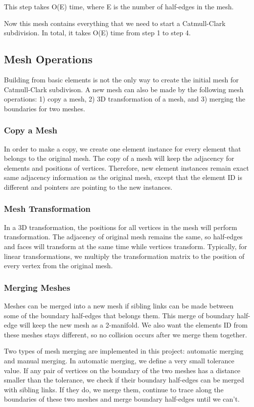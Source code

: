 \documentclass[12pt]{article}
\begin{document}
This step takes O(E) time, where E is the number of half-edges in the mesh.

Now this mesh contains everything that we need to start a Catmull-Clark subdivision. In total, it takes O(E) time from step 1 to step 4.

\subsection{Mesh Operations}
Building from basic elements is not the only way to create the initial mesh for Catmull-Clark subdivison. A new mesh can also be made by the following mesh operations: 1) copy a mesh, 2) 3D transformation of a mesh, and 3) merging the boundaries for two meshes. 

\subsubsection{Copy a Mesh}
In order to make a copy, we create one element instance for every element that belongs to the original mesh. The copy of a mesh will keep the adjacency for elements and positions of vertices. Therefore, new element instances remain exact same adjacency information as the original mesh, except that the element ID is different and pointers are pointing to the new instances. 

\subsubsection{Mesh Transformation}
In a 3D transformation, the positions for all vertices in the mesh will perform transformation. The adjacency of original mesh remains the same, so half-edges and faces will transform at the same time while vertices transform. Typically, for linear transformations, we multiply the transformation matrix to the position of every vertex from the original mesh.

\subsubsection{Merging Meshes}
Meshes can be merged into a new mesh if sibling links can be made between some of the boundary half-edges that belongs them. This merge of boundary half-edge will keep the new mesh as a 2-manifold. We also want the elements ID from these meshes stays different, so no collision occurs after we merge them together.

Two types of mesh merging are implemented in this project: automatic merging and manual merging. In automatic merging, we define a very small tolerance value. If any pair of vertices on the boundary of the two meshes has a distance smaller than the tolerance, we check if their boundary half-edges can be merged with sibling links. If they do, we merge them, continue to trace along the boundaries of these two meshes and merge boundary half-edges until we can't.
\end{document}
